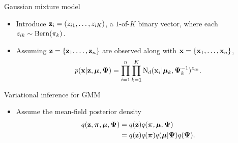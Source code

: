\begin{frame}{Gaussian mixture model}
  \vspace{2mm}
  \begin{itemize}
    \item Introduce ${\mathbf z}_i = (z_{i1},\dots,z_{iK})$, a $1$-of-$K$ binary vector, where each $z_{ik} \sim \operatorname{Bern}(\pi_k)$.
    \item Assuming ${\mathbf z} = \{{\mathbf z}_1,\dots,{\mathbf z}_n \}$ are observed along with ${\mathbf x} = \{{\mathbf x}_1,\dots,{\mathbf x}_n \}$,
    \[
      p({\mathbf x}|{\mathbf z},{\bm\mu},{\bm\Psi}) = \prod_{i=1}^n \prod_{k=1}^K \operatorname{N}_d({\mathbf x}_i|{\bm\mu}_k,{\bm\Psi}_k^{-1})^{z_{ik}}.
    \]
  \end{itemize}
\end{frame}

\begin{frame}{Variational inference for GMM}
  \begin{itemize}
    \item Assume the mean-field posterior density
    \begin{align*}
      q({\mathbf z},{\bm\pi},{\bm\mu},{\bm\Psi}) &= q({\mathbf z})q({\bm\pi},{\bm\mu},{\bm\Psi}) \\
      &= q({\mathbf z})q({\bm\pi})q({\bm\mu}|{\bm\Psi})q({\bm\Psi}).
    \end{align*}
  \end{itemize}
  
  \begin{center}
  \end{center}
  
\end{frame}

